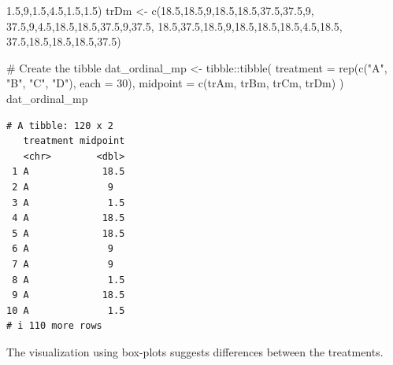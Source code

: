\documentclass[
  letterpaper,
]{book}
\newenvironment{Shaded}{\begin{snugshade}}{\end{snugshade}}
\newcommand{\AttributeTok}[1]{\textcolor[rgb]{0.40,0.45,0.13}{#1}}
\newcommand{\CommentTok}[1]{\textcolor[rgb]{0.37,0.37,0.37}{#1}}
\newcommand{\DecValTok}[1]{\textcolor[rgb]{0.68,0.00,0.00}{#1}}
\newcommand{\FloatTok}[1]{\textcolor[rgb]{0.68,0.00,0.00}{#1}}
\newcommand{\FunctionTok}[1]{\textcolor[rgb]{0.28,0.35,0.67}{#1}}
\newcommand{\NormalTok}[1]{\textcolor[rgb]{0.00,0.23,0.31}{#1}}
\newcommand{\OtherTok}[1]{\textcolor[rgb]{0.00,0.23,0.31}{#1}}
\newcommand{\SpecialCharTok}[1]{\textcolor[rgb]{0.37,0.37,0.37}{#1}}
\newcommand{\StringTok}[1]{\textcolor[rgb]{0.13,0.47,0.30}{#1}}
\begin{document}
\begin{Shaded}
\begin{Highlighting}[]
          \FloatTok{1.5}\NormalTok{,}\DecValTok{9}\NormalTok{,}\FloatTok{1.5}\NormalTok{,}\FloatTok{4.5}\NormalTok{,}\FloatTok{1.5}\NormalTok{,}\FloatTok{1.5}\NormalTok{)}
\NormalTok{trDm }\OtherTok{\textless{}{-}} \FunctionTok{c}\NormalTok{(}\FloatTok{18.5}\NormalTok{,}\FloatTok{18.5}\NormalTok{,}\DecValTok{9}\NormalTok{,}\FloatTok{18.5}\NormalTok{,}\FloatTok{18.5}\NormalTok{,}\FloatTok{37.5}\NormalTok{,}\FloatTok{37.5}\NormalTok{,}\DecValTok{9}\NormalTok{,}
          \FloatTok{37.5}\NormalTok{,}\DecValTok{9}\NormalTok{,}\FloatTok{4.5}\NormalTok{,}\FloatTok{18.5}\NormalTok{,}\FloatTok{18.5}\NormalTok{,}\FloatTok{37.5}\NormalTok{,}\DecValTok{9}\NormalTok{,}\FloatTok{37.5}\NormalTok{,}
       \FloatTok{18.5}\NormalTok{,}\FloatTok{37.5}\NormalTok{,}\FloatTok{18.5}\NormalTok{,}\DecValTok{9}\NormalTok{,}\FloatTok{18.5}\NormalTok{,}\FloatTok{18.5}\NormalTok{,}\FloatTok{18.5}\NormalTok{,}\FloatTok{4.5}\NormalTok{,}\FloatTok{18.5}\NormalTok{,}
       \FloatTok{37.5}\NormalTok{,}\FloatTok{18.5}\NormalTok{,}\FloatTok{18.5}\NormalTok{,}\FloatTok{18.5}\NormalTok{,}\FloatTok{37.5}\NormalTok{)}

\CommentTok{\# Create the tibble}
\NormalTok{dat\_ordinal\_mp }\OtherTok{\textless{}{-}}\NormalTok{ tibble}\SpecialCharTok{::}\FunctionTok{tibble}\NormalTok{(}
  \AttributeTok{treatment =} \FunctionTok{rep}\NormalTok{(}\FunctionTok{c}\NormalTok{(}\StringTok{"A"}\NormalTok{, }\StringTok{"B"}\NormalTok{, }\StringTok{"C"}\NormalTok{, }\StringTok{"D"}\NormalTok{), }
                  \AttributeTok{each =} \DecValTok{30}\NormalTok{),}
  \AttributeTok{midpoint =} \FunctionTok{c}\NormalTok{(trAm, trBm, trCm, trDm)}
\NormalTok{)}
\NormalTok{dat\_ordinal\_mp}
\end{Highlighting}
\end{Shaded}

\begin{verbatim}
# A tibble: 120 x 2
   treatment midpoint
   <chr>        <dbl>
 1 A             18.5
 2 A              9  
 3 A              1.5
 4 A             18.5
 5 A             18.5
 6 A              9  
 7 A              9  
 8 A              1.5
 9 A             18.5
10 A              1.5
# i 110 more rows
\end{verbatim}

The visualization using box-plots suggests differences between the
treatments.
\end{document}

